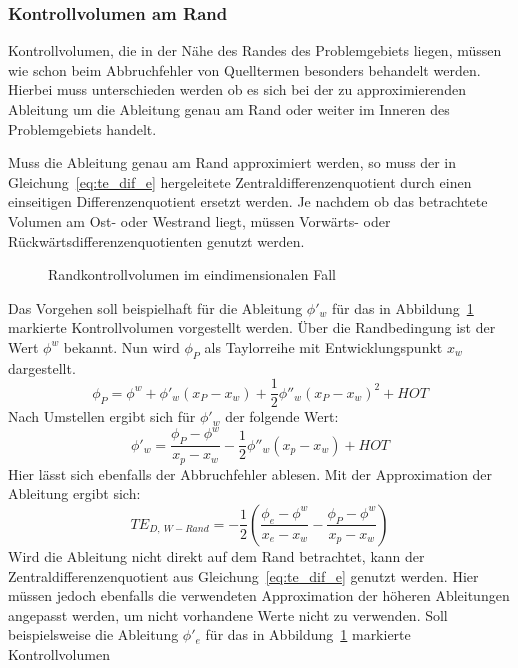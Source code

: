 \subsubsection{Kontrollvolumen am Rand}
\label{sec:te_dif_rand}

Kontrollvolumen, die in der Nähe des Randes des Problemgebiets liegen, müssen wie schon beim
Abbruchfehler von Quelltermen besonders behandelt werden. Hierbei muss unterschieden werden ob es sich
bei der zu approximierenden Ableitung um die Ableitung genau am Rand oder weiter im Inneren des
Problemgebiets handelt.

Muss die Ableitung genau am Rand approximiert werden, so muss der in Gleichung~\ref{eq:te_dif_e} hergeleitete
Zentraldifferenzenquotient durch einen einseitigen Differenzenquotient ersetzt werden. Je nachdem ob das
betrachtete Volumen am Ost- oder Westrand liegt, müssen Vorwärts- oder Rückwärtsdifferenzenquotienten genutzt werden.
\begin{figure}[hb]

\centering
\caption{Randkontrollvolumen im eindimensionalen Fall}
\label{fig:kv1d_rand}
\end{figure}
Das Vorgehen soll beispielhaft für die Ableitung $\phi'_w$ für das in Abbildung~\ref{fig:kv1d_rand} markierte Kontrollvolumen
vorgestellt werden.
Über die Randbedingung ist der Wert $\phi^w$ bekannt. Nun wird $\phi_P$ als Taylorreihe mit Entwicklungspunkt
$x_w$ dargestellt.
\begin{equation*}
  \phi_P = \phi^w + \phi'_w (x_P-x_w) + \frac{1}{2} \phi''_w (x_P-x_w)^2 + HOT
\end{equation*}
Nach Umstellen ergibt sich für $\phi'_w$ der folgende Wert:
\begin{equation}
  \phi'_w = \frac{\phi_P-\phi^w}{x_p-x_w} -\frac{1}{2} \phi''_w(x_p-x_w) + HOT
\end{equation}
Hier lässt sich ebenfalls der Abbruchfehler ablesen. Mit der Approximation der Ableitung
ergibt sich:
\begin{equation}
  TE_{D,\ W-Rand} = -\frac{1}{2} \left({\frac{\phi_e-\phi^w}{x_e-x_w}-
  \frac{\phi_P-\phi^w}{x_p-x_w} }\right)
\end{equation}
Wird die Ableitung nicht direkt auf dem Rand betrachtet, kann der Zentraldifferenzenquotient
aus Gleichung~\ref{eq:te_dif_e} genutzt werden. Hier müssen jedoch ebenfalls die verwendeten
Approximation der höheren Ableitungen angepasst werden, um nicht vorhandene Werte nicht zu verwenden.
Soll beispielsweise die Ableitung $\phi'_e$ für das in Abbildung~\ref{fig:kv1d_rand} markierte Kontrollvolumen
